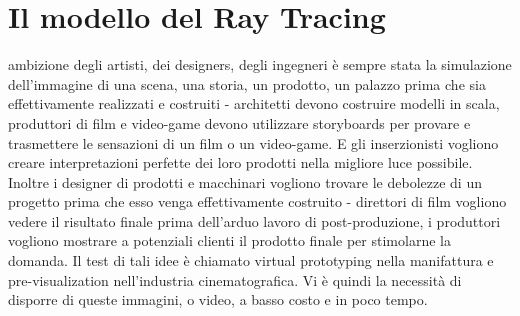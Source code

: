 \documentclass[9pt,a4paper,twoside]{tau}
\begin{document}

\section{Il modello del Ray Tracing}
ambizione degli artisti, dei designers, degli ingegneri è sempre stata la simulazione dell'immagine di una scena, una storia, un prodotto, un palazzo prima che sia effettivamente realizzati e costruiti - architetti devono costruire modelli in scala, produttori di film e video-game devono utilizzare storyboards per provare e trasmettere le sensazioni di un film o un video-game. E gli inserzionisti vogliono creare interpretazioni perfette dei loro prodotti nella migliore luce possibile. Inoltre i designer di prodotti e macchinari vogliono trovare le debolezze di un progetto prima che esso venga effettivamente costruito - direttori di film vogliono vedere il risultato finale prima dell'arduo lavoro di post-produzione, i produttori vogliono mostrare a potenziali clienti il prodotto finale per stimolarne la domanda. Il test di tali idee è chiamato virtual prototyping nella manifattura e pre-visualization nell'industria cinematografica. Vi è quindi la necessità di disporre di queste immagini, o video, a basso costo e in poco tempo.\\
\end{document}
